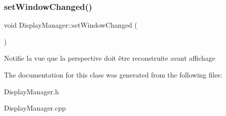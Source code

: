 \subsubsection{\texorpdfstring{setWindowChanged()}{setWindowChanged()}}
{\footnotesize\ttfamily void Display\+Manager\+::set\+Window\+Changed (\begin{DoxyParamCaption}{ }\end{DoxyParamCaption})}

Notifie la vue que la perspective doit être reconstruite avant affichage 

The documentation for this class was generated from the following files\+:\begin{DoxyCompactItemize}
\item 
Display\+Manager.\+h\item 
Display\+Manager.\+cpp\end{DoxyCompactItemize}
